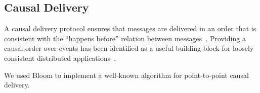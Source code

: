 \subsection{Causal Delivery}

A causal delivery protocol ensures that messages are delivered in an order that
is consistent with the ``happens before'' relation between
messages~\cite{Lamport1978}. Providing a causal order over events has been
identified as a useful building block for loosely consistent distributed
applications~\cite{Lloyd2011}.

We used Bloom to implement a well-known algorithm for point-to-point causal
delivery\cite{Schiper1989}.
